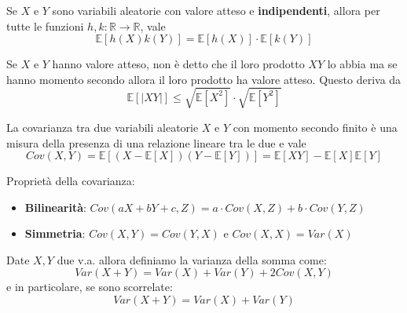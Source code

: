 \begin{proposition}
	Se $X$ e $Y$ sono variabili aleatorie con valore atteso e \textbf{indipendenti}, allora per tutte le funzioni $h,k: \mathbb{R} \to \mathbb{R}$, vale
	\begin{equation}
		\mathbb{E}[h(X)k(Y)]=\mathbb{E}[h(X)]\cdot\mathbb{E}[k(Y)]
	\end{equation}
\end{proposition}

\begin{proposition}
	Se $X$ e $Y$ hanno valore atteso, non è detto che il loro prodotto $XY$ lo abbia ma se hanno momento secondo allora il loro prodotto ha valore atteso. Questo deriva da
	\begin{equation}
		\mathbb{E}[\lvert XY \rvert] \leq \sqrt{\mathbb{E}[X^2]} \cdot \sqrt{\mathbb{E}[Y^2]}
	\end{equation}
\end{proposition}

\begin{definition}[Covarianza]
	La covarianza tra due variabili aleatorie $X$ e $Y$ con momento secondo finito è una misura della presenza di una relazione lineare tra le due e vale
	\begin{equation}
		Cov(X,Y) = \mathbb{E}[(X - \mathbb{E}[X])(Y-\mathbb{E}[Y])] = \mathbb{E}[XY] - \mathbb{E}[X]\mathbb{E}[Y]
	\end{equation}
\end{definition}

\begin{proposition}
	Proprietà della covarianza:
	\begin{itemize}
		\item \textbf{Bilinearità}: $Cov(aX+bY+c,Z) = a \cdot Cov(X,Z) + b \cdot Cov(Y,Z)$
		\item \textbf{Simmetria}: $Cov(X,Y) = Cov(Y,X)$ e $Cov(X,X) = Var(X)$
	\end{itemize}
\end{proposition}

\begin{proposition}
	Date $X,Y$ due v.a. allora definiamo la varianza della somma come:
	\begin{equation}
		Var(X+Y) = Var(X)+Var(Y)+2Cov(X,Y)
	\end{equation}
	e in particolare, se sono scorrelate:
	\begin{equation}
		Var(X+Y) = Var(X)+Var(Y)
	\end{equation}
\end{proposition}


